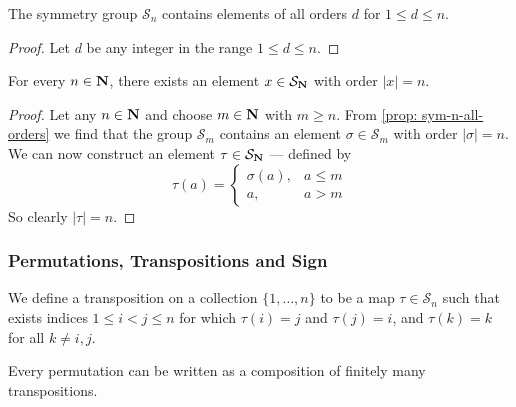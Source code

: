 \begin{proposition}\label{prop: sym-n-all-orders}
  The symmetry group \(\mathcal S_n\) contains elements of all orders \(d\) for
  \(1 \leq d \leq n\).
\end{proposition}

\begin{proof}
  Let \(d\) be any integer in the range \(1 \leq d \leq n\).
\end{proof}

\begin{corollary}
  For every \(n \in \mathbf{N}\), there exists an element \(x \in \mathcal S_{\mathbf{N}}\) with
  order \(|x| = n\).
\end{corollary}

\begin{proof}
  Let any \(n \in \mathbf{N}\) and choose \(m \in \mathbf{N}\) with \(m \geq n\). From
  \cref{prop: sym-n-all-orders} we find that the group \(\mathcal S_m\) contains
  an element \(\sigma \in \mathcal S_m\) with order \(|\sigma| = n\). We can now
  construct an element \(\tau \in \mathcal S_{\mathbf{N}}\) --- defined by
  \[
    \tau(a) =
    \begin{cases}
      \sigma(a), &a \leq m \\
      a, &a > m
    \end{cases}
  \]
  So clearly \(|\tau| = n\).
\end{proof}

\subsubsection{Permutations, Transpositions and Sign}

\begin{definition}[Transposition]
  \label{def: transposition}
  We define a transposition on a collection \(\{1, \dots, n\}\) to be a map
  \(\tau \in \mathcal S_n\) such that exists indices \(1 \leq i < j \leq n\)
  for which \(\tau(i) = j\) and \(\tau(j) = i\), and \(\tau(k) = k\) for all
  \(k \neq i, j\).
\end{definition}

\begin{proposition}\label{prop: permutations to transpositions}
  Every permutation can be written as a composition of finitely many
  transpositions.
\end{proposition}

